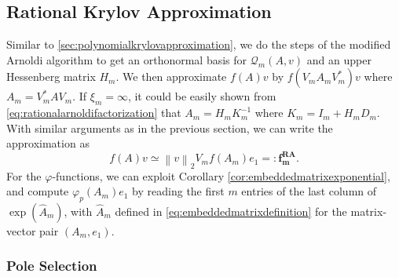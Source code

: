 \subsection{Rational Krylov Approximation}
\label{sec:rationalkrylovapproximation}
Similar to \autoref{sec:polynomialkrylovapproximation}, we do the steps of the modified Arnoldi
algorithm to get an orthonormal basis for $\mathcal{Q}_m(A, v)$ and an upper
Hessenberg matrix $H_m$. We then approximate $f(A)v$ by
$f(V_m A_m V_m^*)v$ where $A_m = V_m^* A V_m$. If $\xi_m = \infty$,
it could be easily shown from \eqref{eq:rationalarnoldifactorization} that
$A_m = H_m K_m^{-1}$ where $K_m = I_m + H_m D_m$. With similar arguments
as in the previous section, we can write the approximation as
\begin{equation}
    \label{eq:rationalkrylovapproximation}
    f(A)v \simeq \left\| v \right\|_{2} V_m f(A_m) e_1 =: \mathbf{f_{m}^{RA}}.
\end{equation}
For the $\varphi$-functions, we can exploit Corollary \ref{cor:embeddedmatrixexponential},
and compute $\varphi_p(A_m) e_1$ by reading the first $m$ entries of the last column of
$\exp(\hat{A}_m)$, with $\hat{A}_m$ defined in \eqref{eq:embeddedmatrixdefinition}
for the matrix-vector pair $(A_m, e_1)$.

\subsubsection{Pole Selection}

